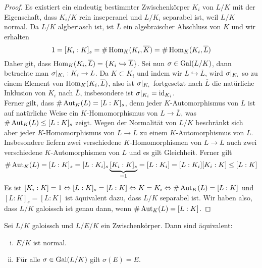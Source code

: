 \documentclass{scrartcl}
\begin{document}
    \begin{proof}
        Es existiert ein eindeutig bestimmter Zwischenkörper $K_i$ von $L/K$ mit der Eigenschaft, dass $K_i/K$ rein inseperanel und $L/K_i$ separabel ist, weil $L/K$ normal. 
        Da $L/K$ algberiasch ist, ist $\overline{L}$ ein algebraischer Abschluss von $K$ und wir erhalten 
        \[
        1 = [K_i:K]_s = \#\operatorname{Hom}_K(K_i,\overline{K}) = \#\operatorname{Hom}_K(K_i,\overline{L})    
        \]
        Daher git, dass $\operatorname{Hom}_K(K_i,\overline{L})=\{K_i\hookrightarrow \overline{L}\}$. Sei nun $\sigma\in \operatorname{Gal}(L/K)$, dann betrachte man $\sigma|_{K_i}:K_i\to L$. Da $K\subset K_i$ und indem wir $L\hookrightarrow \overline{L}$, wird $\sigma|_{K_i}$ so zu einem Element von $\operatorname{Hom}_K(K_i,\overline{L})$, also ist $\sigma|_{K_i}$ fortgesetzt nach $\overline{L}$ die natürliche Inklusion von $K_i$ nach $\overline{L}$, insbesondere ist $\sigma|_{K_i}=\operatorname{id}_{K_i}$. \\
        Ferner gilt, dass $\#\operatorname{Aut}_K(L)=[L:K]_s$, denn jeder $K$-Automorphismus von $L$ ist auf natürliche Weise ein $K$-Homomorphismus von $L\to \overline{L}$, was $\#\operatorname{Aut}_K(L)\le [L:K]_s$ zeigt. Wegen der Normalität von 
        $L/K$ beschränkt sich aber jeder $K$-Homomorphismus von $L\to \overline{L}$ zu einem $K$-Automorphismus von $L$. Insbesondere liefern zwei verschiedene $K$-Homomorphismen von $L\to \overline{L}$ auch zwei verschiedene $K$-Automorphismen von $L$ und es gilt Gleichheit. Ferner gilt 
        \[
        \#\operatorname{Aut}_K(L) = [L:K]_s = [L:K_i]_s \underbrace{[K_i:K]_s}_{=1} = [L:K_i] = [L:K_i][K_i:K]\le [L:K]    
        \] 
        Es ist $[K_i:K]=1 \Leftrightarrow [L:K]_s = [L:K] \Leftrightarrow K=K_i \Leftrightarrow \#\operatorname{Aut}_K(L) = [L:K]$ und $[L:K]_s=[L:K]$ ist äquivalent dazu, dass $L/K$ separabel ist. Wir haben also, dass $L/K$ galoissch ist genau dann, wenn $\#\operatorname{Aut}_K(L)=[L:K]$. 
    \end{proof}
\begin{prop}
    Sei $L/K$ galoissch und $L/E/K$ ein Zwischenkörper. Dann sind äquivalent:
    \begin{enumerate}[(i)]
        \item $E/K$ ist normal.
        \item Für alle $\sigma\in \operatorname{Gal}(L/K)$ gilt $\sigma(E)=E$.
    \end{enumerate} 
\end{prop}
\end{document}
